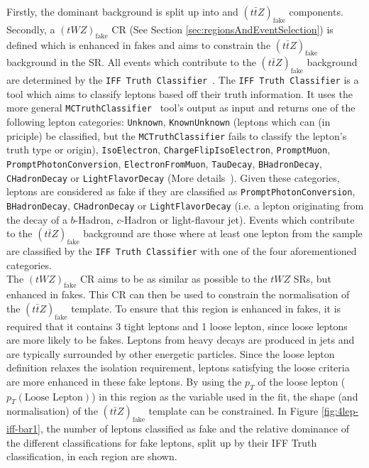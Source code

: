 Firstly, the dominant \ttZ background is split up into \ttZ and $(t\bar{t}Z)_{\text{fake}}$ components. Secondly, a $(tWZ)_{\text{fake}}$ CR (See Section \ref{sec:regionsAndEventSelection}) is defined which is enhanced in fakes and aims to constrain the $(t\bar{t}Z)_{\text{fake}}$ background in the SR. All events which contribute to the $(t\bar{t}Z)_{\text{fake}}$ background are determined by the \texttt{IFF Truth Classifier}~\cite{IFFTruthClassifier}. The \texttt{IFF Truth Classifier} is a tool which aims to classify leptons based off their truth information. It uses the more general \texttt{MCTruthClassifier}~\cite{MCTruthClassifier} tool's output as input and returns one of the following lepton categories: \texttt{Unknown}, \texttt{KnownUnknown} (leptons which can (in priciple) be classified, but the \texttt{MCTruthClassifier} fails to classify the lepton's truth type or origin), \texttt{IsoElectron}, \texttt{ChargeFlipIsoElectron}, \texttt{PromptMuon}, \texttt{PromptPhotonConversion}, \texttt{ElectronFromMuon}, \texttt{TauDecay}, \texttt{BHadronDecay}, \texttt{CHadronDecay} or \texttt{LightFlavorDecay} (More details~\cite{IFFTruthClassifier}). Given these categories, leptons are considered as fake if they are classified as \texttt{PromptPhotonConversion}, \texttt{BHadronDecay}, \texttt{CHadronDecay} or \texttt{LightFlavorDecay} (i.e. a lepton originating from the decay of a $b$-Hadron, $c$-Hadron or light-flavour jet). Events which contribute to the $(t\bar{t}Z)_{\text{fake}}$ background are those where at least one lepton from the \ttZ sample are classified by the \texttt{IFF Truth Classifier} with one of the four aforementioned categories.\\

The $(tWZ)_{\text{fake}}$ CR aims to be as similar as possible to the $tWZ$ SRs, but enhanced in fakes. This CR can then be used to constrain the normalisation of the $(t\bar{t}Z)_{\text{fake}}$ template. To ensure that this region is enhanced in fakes, it is required that it contains 3 tight leptons and 1 loose lepton, since loose leptons are more likely to be fakes. Leptons from heavy decays are produced in jets and are typically surrounded by other energetic particles. Since the loose lepton definition relaxes the isolation requirement, leptons satisfying the loose criteria are more enhanced in these fake leptons. By using the $p_{T}$ of the loose lepton ($p_{T}(\text{Loose Lepton})$) in this region as the variable used in the fit, the shape (and normalisation) of the $(t\bar{t}Z)_{\text{fake}}$ template can be constrained. In Figure \ref{fig:4lep-iff-bar1}, the number of leptons classified as fake and the relative dominance of the different classifications for fake leptons, split up by their IFF Truth classification, in each region are shown.

